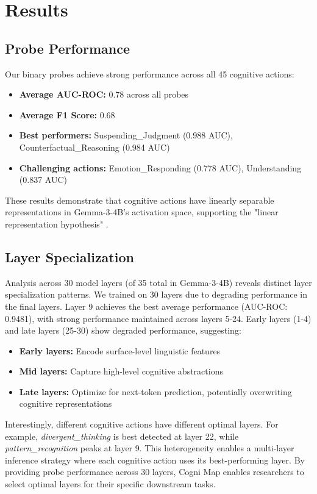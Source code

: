 \documentclass[letterpaper]{article}
\begin{document}
\section{Results}

\subsection{Probe Performance}

Our binary probes achieve strong performance across all 45 cognitive actions:
\begin{itemize}
    \item \textbf{Average AUC-ROC:} 0.78 across all probes
    \item \textbf{Average F1 Score:} 0.68
    \item \textbf{Best performers:} Suspending\_Judgment (0.988 AUC), Counterfactual\_Reasoning (0.984 AUC)
    \item \textbf{Challenging actions:} Emotion\_Responding (0.778 AUC), Understanding (0.837 AUC)
\end{itemize}

These results demonstrate that cognitive actions have linearly separable representations in Gemma-3-4B's activation space, supporting the "linear representation hypothesis" \cite{alain2016understanding}.

\subsection{Layer Specialization}

Analysis across 30 model layers (of 35 total in Gemma-3-4B) reveals distinct layer specialization patterns. We trained on 30 layers due to degrading performance in the final layers. Layer 9 achieves the best average performance (AUC-ROC: 0.9481), with strong performance maintained across layers 5-24. Early layers (1-4) and late layers (25-30) show degraded performance, suggesting:
\begin{itemize}
    \item \textbf{Early layers:} Encode surface-level linguistic features
    \item \textbf{Mid layers:} Capture high-level cognitive abstractions
    \item \textbf{Late layers:} Optimize for next-token prediction, potentially overwriting cognitive representations
\end{itemize}

Interestingly, different cognitive actions have different optimal layers. For example, \textit{divergent\_thinking} is best detected at layer 22, while \textit{pattern\_recognition} peaks at layer 9. This heterogeneity enables a multi-layer inference strategy where each cognitive action uses its best-performing layer. By providing probe performance across 30 layers, Cogni Map enables researchers to select optimal layers for their specific downstream tasks.
\end{document}
